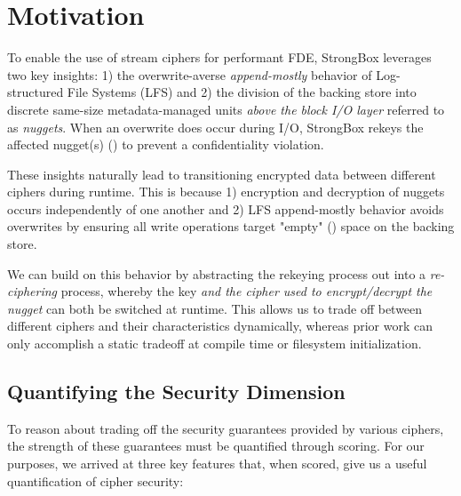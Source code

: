 \section{Motivation}\label{sec:motivation}


To enable the use of stream ciphers for performant FDE, StrongBox leverages two
key insights: 1) the overwrite-averse \emph{append-mostly} behavior of
Log-structured File Systems (LFS) and 2) the division of the backing store into
discrete same-size metadata-managed units \emph{above the block I/O layer}
referred to as \emph{nuggets}. When an overwrite does occur during I/O,
StrongBox rekeys the affected nugget(s) () to prevent
a confidentiality violation.

These insights naturally lead to transitioning encrypted data between different
ciphers during runtime. This is because 1) encryption and decryption of nuggets
occurs independently of one another and 2) LFS append-mostly behavior avoids
overwrites by ensuring all write operations target "empty" () space on the backing store.

We can build on this behavior by abstracting the rekeying process out into a
\emph{re-ciphering} process, whereby the key \emph{and the cipher used to
encrypt/decrypt the nugget} can both be switched at runtime. This allows us to
trade off between different ciphers and their characteristics dynamically,
whereas prior work can only accomplish a static tradeoff at compile time or
filesystem initialization.

\subsection{Quantifying the Security Dimension}

To reason about trading off the security guarantees provided by various ciphers,
the strength of these guarantees must be quantified through scoring. For our
purposes, we arrived at three key features that, when scored, give us a useful
quantification of cipher security:

